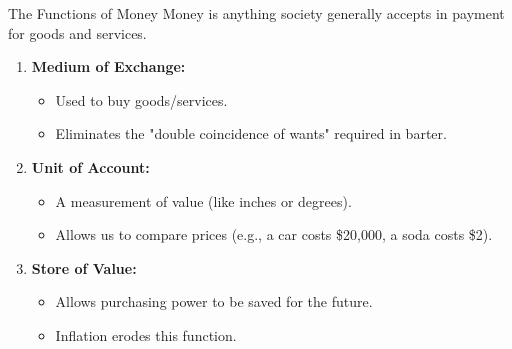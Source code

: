 \documentclass[aspectratio=169]{beamer}
\begin{document}
\begin{frame}{The Functions of Money}
    Money is anything society generally accepts in payment for goods and services.
    
    \vspace{0.5cm}
    \begin{enumerate}
        \item \textbf{Medium of Exchange:}
        \begin{itemize}
            \item Used to buy goods/services.
            \item Eliminates the "double coincidence of wants" required in barter.
        \end{itemize}
        \item \textbf{Unit of Account:}
        \begin{itemize}
            \item A measurement of value (like inches or degrees).
            \item Allows us to compare prices (e.g., a car costs \$20,000, a soda costs \$2).
        \end{itemize}
        \item \textbf{Store of Value:}
        \begin{itemize}
            \item Allows purchasing power to be saved for the future.
            \item Inflation erodes this function.
        \end{itemize}
    \end{enumerate}
\end{frame}
\end{document}

